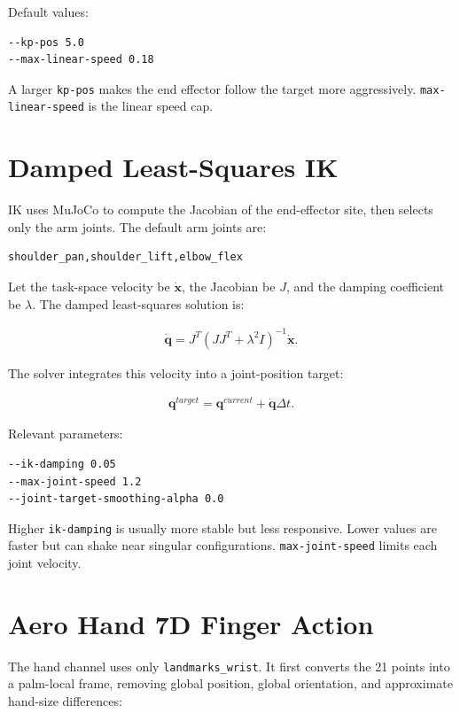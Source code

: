 \documentclass[11pt]{article}
\begin{document}
Default values:

\begin{lstlisting}
--kp-pos 5.0
--max-linear-speed 0.18
\end{lstlisting}

A larger \texttt{kp-pos} makes the end effector follow the target more
aggressively. \texttt{max-linear-speed} is the linear speed cap.

\section{Damped Least-Squares IK}

IK uses MuJoCo to compute the Jacobian of the end-effector site, then selects
only the arm joints. The default arm joints are:

\begin{lstlisting}
shoulder_pan,shoulder_lift,elbow_flex
\end{lstlisting}

Let the task-space velocity be \(\dot{\mathbf{x}}\), the Jacobian be \(J\), and
the damping coefficient be \(\lambda\). The damped least-squares solution is:

\begin{align}
\dot{\mathbf{q}}
  = J^T(JJ^T+\lambda^2I)^{-1}\dot{\mathbf{x}}.
\end{align}

The solver integrates this velocity into a joint-position target:

\begin{align}
\mathbf{q}^{target}
  = \mathbf{q}^{current}+\dot{\mathbf{q}}\Delta t.
\end{align}

Relevant parameters:

\begin{lstlisting}
--ik-damping 0.05
--max-joint-speed 1.2
--joint-target-smoothing-alpha 0.0
\end{lstlisting}

Higher \texttt{ik-damping} is usually more stable but less responsive. Lower
values are faster but can shake near singular configurations.
\texttt{max-joint-speed} limits each joint velocity.

\section{Aero Hand 7D Finger Action}

The hand channel uses only \texttt{landmarks\_wrist}. It first converts the 21
points into a palm-local frame, removing global position, global orientation,
and approximate hand-size differences:
\end{document}
